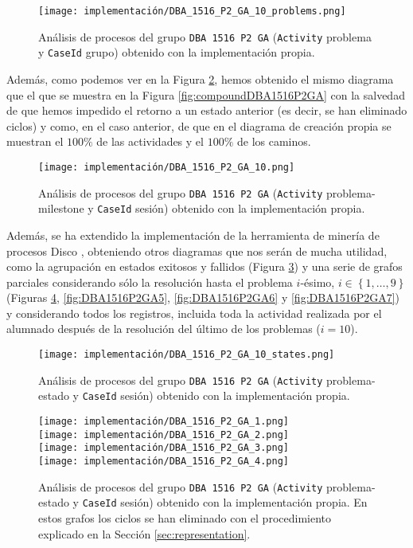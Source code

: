 \begin{figure}[H]
    \centering
    \texttt{[image: implementación/DBA\_1516\_P2\_GA\_10\_problems.png]}
    \caption{Análisis de procesos del grupo \texttt{DBA 1516 P2 GA} (\texttt{Activity} problema y \texttt{CaseId} grupo) obtenido con la implementación propia.}
    \label{fig:DBA1516P2GA1}
\end{figure}

Además, como podemos ver en la Figura \ref{fig:DBA1516P2GA2}, hemos obtenido el mismo diagrama que el que se muestra en la Figura \ref{fig:compoundDBA1516P2GA} con la salvedad de que hemos impedido el retorno a un estado anterior (es decir, se han eliminado ciclos) y como, en el caso anterior, de que en el diagrama de creación propia se muestran el $100\%$ de las actividades y el $100\%$ de los caminos.

\begin{figure}[H]
    \centering
    \texttt{[image: implementación/DBA\_1516\_P2\_GA\_10.png]}
    \caption{Análisis de procesos del grupo \texttt{DBA 1516 P2 GA} (\texttt{Activity} problema-milestone y \texttt{CaseId} sesión) obtenido con la implementación propia.}
    \label{fig:DBA1516P2GA2}
\end{figure}

Además, se ha extendido la implementación de la herramienta de minería de procesos Disco \cite{gunther2012disco}, obteniendo otros diagramas que nos serán de mucha utilidad, como la agrupación en estados exitosos y fallidos (Figura \ref{fig:DBA1516P2GA3}) y una serie de grafos parciales considerando sólo la resolución hasta el problema $i$-ésimo, $i \in \left\lbrace 1,\dots,9 \right\rbrace$ (Figuras \ref{fig:DBA1516P2GA4}, \ref{fig:DBA1516P2GA5}, \ref{fig:DBA1516P2GA6} y \ref{fig:DBA1516P2GA7}) y considerando todos los registros, incluida toda la actividad realizada por el alumnado después de la resolución del último de los problemas ($i = 10$).

\begin{figure}[H]
    \centering
    \texttt{[image: implementación/DBA\_1516\_P2\_GA\_10\_states.png]}
    \caption{Análisis de procesos del grupo \texttt{DBA 1516 P2 GA} (\texttt{Activity} problema-estado y \texttt{CaseId} sesión) obtenido con la implementación propia.}
    \label{fig:DBA1516P2GA3}
\end{figure}

\begin{figure}[H]
\centering
\texttt{[image: implementación/DBA\_1516\_P2\_GA\_1.png]} \\
\texttt{[image: implementación/DBA\_1516\_P2\_GA\_2.png]} \\
\texttt{[image: implementación/DBA\_1516\_P2\_GA\_3.png]} \\
\texttt{[image: implementación/DBA\_1516\_P2\_GA\_4.png]}
\caption{Análisis de procesos del grupo \texttt{DBA 1516 P2 GA} (\texttt{Activity} problema-estado y \texttt{CaseId} sesión) obtenido con la implementación propia. En estos grafos los ciclos se han eliminado con el procedimiento explicado en la Sección \ref{sec:representation}.}
\label{fig:DBA1516P2GA4}
\end{figure}

